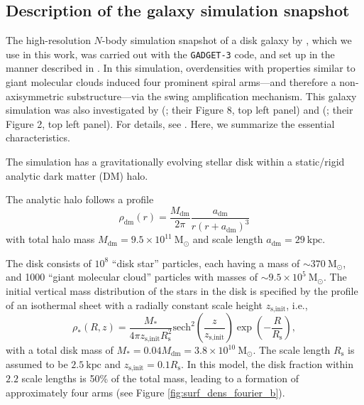 \documentclass[iop,revtex4,numberedappendix,appendixfloats]{emulateapj}
\begin{document}
\begin{figure}[!htbp]
\label{fig:simulation}
\end{figure}

\subsection{Description of the galaxy simulation snapshot} \label{sec:simulation_description}

The high-resolution $N$-body simulation snapshot of a disk galaxy by \citet{2013ApJ...766...34D}, which we use in this work, was carried out with the \texttt{GADGET-3} code, and set up in the manner described in \citet{2005MNRAS.361..776S}. In this simulation, overdensities with properties similar to giant molecular clouds induced four prominent spiral arms---and therefore a non-axisymmetric substructure---via the swing amplification mechanism. This galaxy simulation was also investigated by \citeauthor{2013ApJ...766...34D} (\citeyear{2013ApJ...766...34D}; their Figure 8, top left panel) and \citeauthor{2015ApJ...808L...8D} (\citeyear{2015ApJ...808L...8D}; their Figure 2, top left panel). For details, see \citet{2013ApJ...766...34D}. Here, we summarize the essential characteristics.

The simulation has a gravitationally evolving stellar disk within a static/rigid analytic dark matter (DM) halo.

The analytic halo follows a \citet{1990ApJ...356..359H} profile
\begin{equation}
\rho_\text{dm}(r) = \frac{M_\text{dm}}{2\pi} \frac{a_\text{dm}}{r (r+a_\text{dm})^3} \label{eq:dm_hernquist}
\end{equation}
with total halo mass $M_\text{dm} = 9.5\times 10^{11} ~\text{M}_\odot$ and scale length $a_\text{dm} = 29~\text{kpc}$.

The disk consists of $10^8$ ``disk star'' particles, each having a mass of $\sim370 ~\text{M}_\odot$, and 1000 ``giant molecular cloud'' particles with masses of $\sim9.5\times 10^{5} ~\text{M}_\odot$. The initial vertical mass distribution of the stars in the disk is specified by the profile of an isothermal sheet with a radially constant scale height $z_\text{s,init}$, i.e.,
\begin{equation}
\rho_*(R,z) = \frac{M_*}{4\pi z_\text{s,init} R_\text{s}^2} \text{sech}^2 \left( \frac{z}{z_\text{s,init}}\right) \exp \left(- \frac{R}{R_\text{s}} \right), \label{eq:sech_disk}
\end{equation}
with a total disk mass of $M_* = 0.04 M_\text{dm} = 3.8\times 10^{10}~\text{M}_\odot$. The scale length $R_\text{s}$ is assumed to be $2.5~\text{kpc}$ and $z_\text{s,init}=0.1 R_\text{s}$. In this model, the disk fraction within $2.2$ scale lengths is 50\% of the total mass, leading to a formation of approximately four arms \citep{2015ApJ...808L...8D} (see Figure \ref{fig:surf_dens_fourier_b}).
\end{document}

